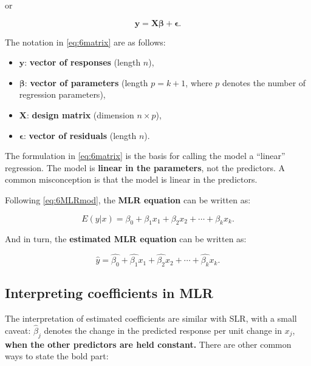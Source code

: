\documentclass[
]{book}
\providecommand{\tightlist}{%
  \setlength{\itemsep}{0pt}\setlength{\parskip}{0pt}}
\begin{document}
or

\begin{equation} 
\boldsymbol{y} = \boldsymbol{X \beta} + \boldsymbol{\epsilon}.
\label{eq:6matrix}
\end{equation}

The notation in \eqref{eq:6matrix} are as follows:

\begin{itemize}
\tightlist
\item
  \(\boldsymbol{y}\): \textbf{vector of responses} (length \(n\)),
\item
  \(\boldsymbol{\beta}\): \textbf{vector of parameters} (length \(p = k+1\), where \(p\) denotes the number of regression parameters),
\item
  \(\boldsymbol{X}\): \textbf{design matrix} (dimension \(n \times p\)),
\item
  \(\boldsymbol{\epsilon}\): \textbf{vector of residuals} (length \(n\)).
\end{itemize}

The formulation in \eqref{eq:6matrix} is the basis for calling the model a ``linear'' regression. The model is \textbf{linear in the parameters}, not the predictors. A common misconception is that the model is linear in the predictors.

Following \eqref{eq:6MLRmod}, the \textbf{MLR equation} can be written as:

\begin{equation} 
E(y|x) = \beta_0+\beta_1 x_1 + \beta_2 x_2 + \cdots + \beta_{k} x_k.
\label{eq:6MLR}
\end{equation}

And in turn, the \textbf{estimated MLR equation} can be written as:

\begin{equation} 
\hat{y} = \hat{\beta_0}+\hat{\beta_1} x_1 + \hat{\beta_2} x_2 + \cdots + \hat{\beta_{k}} x_k.
\label{eq:6MLReq}
\end{equation}

\hypertarget{interpreting-coefficients-in-mlr}{%
\subsection{Interpreting coefficients in MLR}\label{interpreting-coefficients-in-mlr}}

The interpretation of estimated coefficients are similar with SLR, with a small caveat: \(\hat{\beta}_j\) denotes the change in the predicted response per unit change in \(x_j\), \textbf{when the other predictors are held constant.} There are other common ways to state the bold part:
\end{document}
